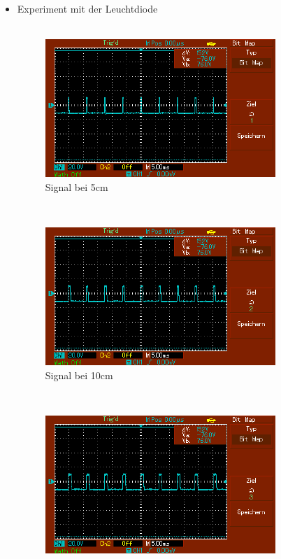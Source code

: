 \documentclass[captions=tableheading]{scrartcl}
\begin{document}
\begin{itemize}
        \item{Experiment mit der Leuchtdiode \\}
        \\
            \begin{figure}
                \centering
                \includegraphics{Lock_In Bilder/Aufgabe 4/MAP001.pdf}
                \caption{Signal bei 5cm}
                \label{fig:5cmled}
            \end{figure}  
            \\
            \begin{figure}   
                \centering 
                \includegraphics{Lock_In Bilder/Aufgabe 4/MAP002.pdf}
                \caption{Signal bei 10cm}
                \label{fig:10cmled}
            \end{figure}   
            \\
            \begin{figure}    
                \centering
                \includegraphics{Lock_In Bilder/Aufgabe 4/MAP003.pdf}

\end{figure}
\end{itemize}
\end{document}
